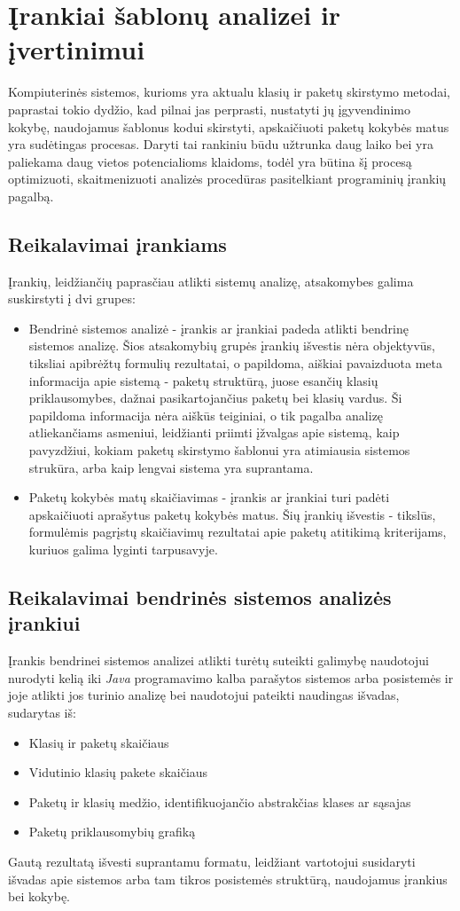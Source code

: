 \section{Įrankiai šablonų analizei ir įvertinimui}
Kompiuterinės sistemos, kurioms yra aktualu klasių ir paketų skirstymo metodai, paprastai tokio dydžio, kad
pilnai jas perprasti, nustatyti jų įgyvendinimo kokybę, naudojamus šablonus kodui skirstyti,
apskaičiuoti paketų kokybės matus yra sudėtingas procesas.
Daryti tai rankiniu būdu užtrunka daug laiko bei yra paliekama daug vietos potencialioms klaidoms,
todėl yra būtina šį procesą optimizuoti, skaitmenizuoti analizės procedūras pasitelkiant
 programinių įrankių pagalbą.

\subsection{Reikalavimai įrankiams}
Įrankių, leidžiančių paprasčiau atlikti sistemų analizę, atsakomybes galima suskirstyti į dvi grupes:
\begin{itemize}
    \item Bendrinė sistemos analizė - įrankis ar įrankiai padeda atlikti bendrinę sistemos analizę.
    Šios atsakomybių grupės įrankių išvestis nėra objektyvūs, tiksliai apibrėžtų formulių rezultatai, o papildoma, aiškiai
    pavaizduota meta informacija apie sistemą - paketų struktūrą, juose esančių klasių priklausomybes, dažnai pasikartojančius paketų bei klasių vardus.
    Ši papildoma informacija nėra aiškūs teiginiai, o tik pagalba analizę atliekančiams asmeniui, leidžianti priimti įžvalgas apie sistemą,
    kaip pavyzdžiui, kokiam paketų skirstymo šablonui yra atimiausia sistemos strukūra, arba kaip lengvai sistema yra suprantama.
    \item Paketų kokybės matų skaičiavimas - įrankis ar įrankiai turi padėti apskaičiuoti aprašytus paketų kokybės matus.
    Šių įrankių išvestis - tikslūs, formulėmis pagrįstų skaičiavimų rezultatai apie paketų atitikimą kriterijams, kuriuos galima lyginti tarpusavyje.
\end{itemize}

\subsection{Reikalavimai bendrinės sistemos analizės įrankiui}
Įrankis bendrinei sistemos analizei atlikti turėtų suteikti galimybę naudotojui nurodyti kelią iki \textit{Java} programavimo kalba parašytos sistemos arba posistemės ir joje
atlikti jos turinio analizę bei naudotojui pateikti naudingas išvadas, sudarytas iš:
\begin{itemize}
    \item Klasių ir paketų skaičiaus
    \item Vidutinio klasių pakete skaičiaus
    \item Paketų ir klasių medžio, identifikuojančio abstrakčias klases ar sąsajas
    \item Paketų priklausomybių grafiką
\end{itemize}
Gautą rezultatą išvesti suprantamu formatu, leidžiant vartotojui susidaryti išvadas apie sistemos arba tam tikros
posistemės struktūrą, naudojamus įrankius bei kokybę.


